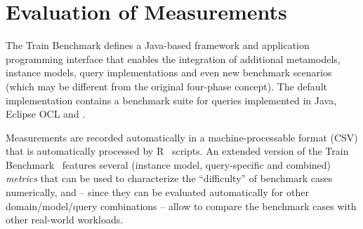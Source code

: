 \section{Evaluation of Measurements}

The Train Benchmark defines a Java-based framework and application programming interface that enables the integration of additional metamodels, instance models, query implementations and even new benchmark scenarios (which may be different from the original four-phase concept). The default implementation contains a benchmark suite for queries implemented in Java, Eclipse OCL and \eiq.

Measurements are recorded automatically in a machine-processable format (CSV) that is automatically processed by R~\cite{TB:R} scripts. An extended version of the Train  Benchmark~\cite{ASE2013} features several (instance model, query-specific and combined) \emph{metrics} that can be used to characterize the ``difficulty'' of benchmark cases numerically, and -- since they can be evaluated automatically for other domain/model/query combinations -- allow to compare the benchmark cases with other real-world workloads.
